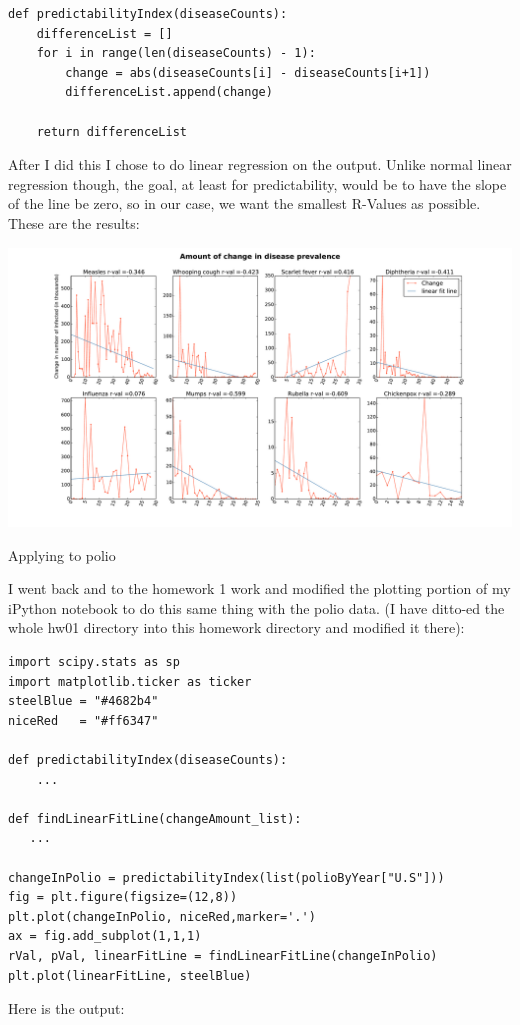 \documentclass[]{article}
\begin{document}
\begin{enumerate}
\begin{verbatim}
def predictabilityIndex(diseaseCounts):
    differenceList = []
    for i in range(len(diseaseCounts) - 1): 
        change = abs(diseaseCounts[i] - diseaseCounts[i+1])
        differenceList.append(change)
        
    return differenceList
\end{verbatim}


After I did this I chose to do linear regression on the output. Unlike normal linear regression though, the goal, at least for predictability, would be to have the slope of the line be zero, so in our case, we want the smallest R-Values as possible. These are the results: 

\centerline{\includegraphics[scale = 0.4]{figures/problem3Output.pdf}}

{\large Applying to polio}

I went back and to the homework 1 work and modified the plotting portion of my iPython notebook to do this same thing with the polio data. (I have ditto-ed the whole hw01 directory into this homework directory and modified it there):

\begin{verbatim}
import scipy.stats as sp
import matplotlib.ticker as ticker
steelBlue = "#4682b4"
niceRed   = "#ff6347"

def predictabilityIndex(diseaseCounts):
    ...

def findLinearFitLine(changeAmount_list):
   ...

changeInPolio = predictabilityIndex(list(polioByYear["U.S"]))
fig = plt.figure(figsize=(12,8))
plt.plot(changeInPolio, niceRed,marker='.')
ax = fig.add_subplot(1,1,1)
rVal, pVal, linearFitLine = findLinearFitLine(changeInPolio)
plt.plot(linearFitLine, steelBlue)
\end{verbatim}
\newpage
Here is the output: 


\end{enumerate}
\end{document}
